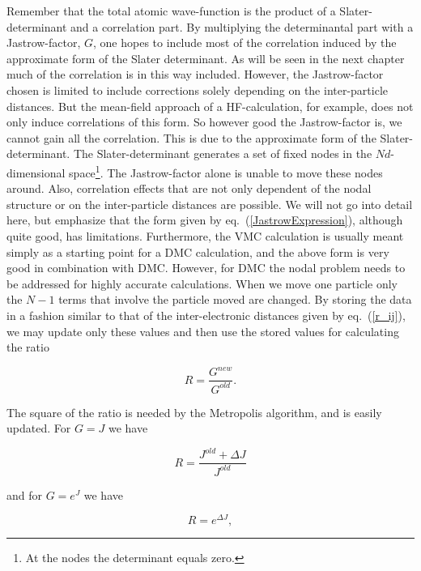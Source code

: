 Remember that the total atomic wave-function is the product of a
Slater-determinant and a correlation part. By multiplying the
determinantal part with a Jastrow-factor, $G$, one hopes to include
most of the correlation induced by the approximate form of 
the Slater determinant. As will be seen in the next chapter much of
the correlation is in this way included. However, the Jastrow-factor
chosen is limited to include corrections solely depending on
the inter-particle distances. But the mean-field approach of a
HF-calculation, for example, does not only induce correlations of this
form. So however good the Jastrow-factor is, we cannot gain all
the correlation. This is due to the approximate form of the
Slater-determinant. The Slater-determinant generates a set of fixed nodes
in the $Nd$-dimensional space\footnote{At the nodes the determinant equals
zero.}. The Jastrow-factor alone is unable to move these nodes around. Also,
correlation effects that are not only dependent of the nodal structure
or on the inter-particle distances are possible. We will not go into
detail here, but emphasize that the form given by
eq.~(\ref{JastrowExpression}), although quite good, has
limitations. Furthermore, the VMC calculation is usually meant simply
as a starting point for a DMC calculation, and the above form is very
good in combination with DMC. However, for DMC the nodal problem
needs to be addressed for highly accurate calculations.
\newline
%
\newline
When we move one particle only the $N-1$ terms that involve the
particle moved are changed. By storing the data in a fashion similar
to that of the inter-electronic distances given by eq.~(\ref{r_ij}),
we may update only these values and then use the stored values for
calculating the ratio

\begin{equation*}
  R = \frac{G^{new}}{G^{old}}.
\end{equation*}

The square of the ratio is needed by the Metropolis algorithm, and is
easily updated. For $G=J$ we have

\begin{equation*}
  R = \frac{J^{old}+\Delta J}{J^{old}}
\end{equation*}

and for $G=e^J$ we have

\begin{equation*}
  R = e^{\Delta J},
\end{equation*}

